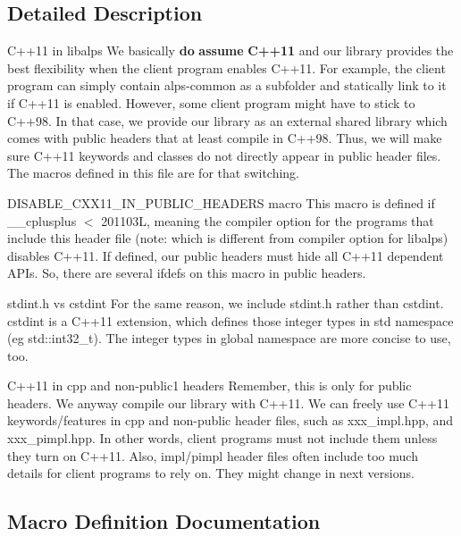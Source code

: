 \subsection{Detailed Description}
\begin{DoxyParagraph}{C++11 in libalps}
We basically {\bfseries do} {\bfseries assume} {\bfseries C++11} and our library provides the best flexibility when the client program enables C++11. For example, the client program can simply contain alps-\/common as a subfolder and statically link to it if C++11 is enabled. However, some client program might have to stick to C++98. In that case, we provide our library as an external shared library which comes with public headers that at least compile in C++98. Thus, we will make sure C++11 keywords and classes do not directly appear in public header files. The macros defined in this file are for that switching.
\end{DoxyParagraph}
\begin{DoxyParagraph}{D\+I\+S\+A\+B\+L\+E\+\_\+\+C\+X\+X11\+\_\+\+I\+N\+\_\+\+P\+U\+B\+L\+I\+C\+\_\+\+H\+E\+A\+D\+E\+RS macro}
This macro is defined if \+\_\+\+\_\+cplusplus $<$ 201103L, meaning the compiler option for the programs that include this header file (note\+: which is different from compiler option for libalps) disables C++11. If defined, our public headers must hide all C++11 dependent A\+P\+Is. So, there are several ifdefs on this macro in public headers.
\end{DoxyParagraph}
\begin{DoxyParagraph}{stdint.h vs cstdint}
For the same reason, we include stdint.\+h rather than cstdint. cstdint is a C++11 extension, which defines those integer types in std namespace (eg std\+::int32\+\_\+t). The integer types in global namespace are more concise to use, too.
\end{DoxyParagraph}
\begin{DoxyParagraph}{C++11 in cpp and non-\/public1 headers}
Remember, this is only for public headers. We anyway compile our library with C++11. We can freely use C++11 keywords/features in cpp and non-\/public header files, such as xxx\+\_\+impl.\+hpp, and xxx\+\_\+pimpl.\+hpp. In other words, client programs must not include them unless they turn on C++11. Also, impl/pimpl header files often include too much details for client programs to rely on. They might change in next versions. 
\end{DoxyParagraph}


\subsection{Macro Definition Documentation}
